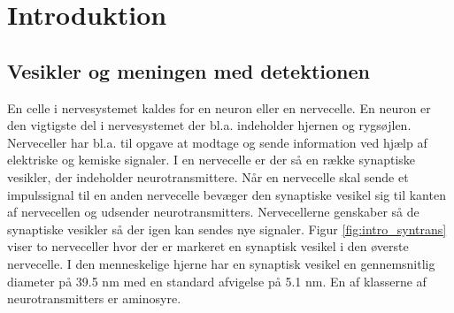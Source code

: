 \section{Introduktion}
\subsection{Vesikler og meningen med detektionen}
En celle i nervesystemet kaldes for en neuron eller en nervecelle.
En neuron er den vigtigste del i nervesystemet der bl.a. indeholder hjernen og rygsøjlen.
Nerveceller har bl.a. til opgave at modtage og sende information ved hjælp af elektriske og kemiske signaler.
I en nervecelle er der så en række synaptiske vesikler, der indeholder neurotransmittere.
Når en nervecelle skal sende et impulssignal til en anden nervecelle bevæger den synaptiske vesikel sig til kanten af nervecellen og udsender neurotransmitters.
Nervecellerne genskaber så de synaptiske vesikler så der igen kan sendes nye signaler.
Figur \ref{fig:intro_syntrans} viser to nerveceller hvor der er markeret en synaptisk vesikel i den øverste nervecelle.
I den menneskelige hjerne har en synaptisk vesikel en gennemsnitlig diameter på 39.5 nm med en standard afvigelse på 5.1 nm.
En af klasserne af neurotransmitters er aminosyre.  

